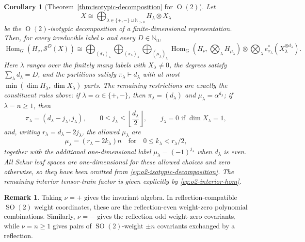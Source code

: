 \documentclass[11pt]{article}
\newcommand{\dsN}{\mathbb{N}}
\newcommand{\scS}{\mathcal{S}}
\newcommand{\HomG}[2]{\operatorname{Hom}_G\!\left(#1,#2\right)}
\newcommand{\SO}{\operatorname{SO}}
\newtheorem{corollary}[theorem]{Corollary}
\theoremstyle{definition}
\newtheorem{remark}[theorem]{Remark}
\begin{document}
\begin{corollary}[Theorem~\ref{thm:isotypic-decomposition} for $\operatorname{O}(2)$]\label{cor:o2-isotypic-decomposition}
  Let
  \[
    X\cong \bigoplus_{\lambda\in\{+,-\}\sqcup\dsN_{>0}}H_\lambda\otimes X_\lambda
  \]
  be the $\operatorname{O}(2)$-isotypic decomposition of a finite-dimensional representation.  Then, for every irreducible label $\nu$ and every $D\in\dsN_0$,
  \begin{equation}\label{eq:o2-isotypic-decomposition}
    \HomG{H_\nu}{\scS^D(X)}
    \cong
    \bigoplus_{(d_\lambda)_\lambda}
    \bigoplus_{(\pi_\lambda)_\lambda}
    \bigoplus_{(\mu_\lambda)_\lambda}
    \HomG{H_\nu}{\bigotimes_\lambda H_{\mu_\lambda}}
    \otimes
    \bigotimes_\lambda e_{\pi_\lambda}^*(X_\lambda^{\otimes d_\lambda}).
  \end{equation}
  Here $\lambda$ ranges over the finitely many labels with $X_\lambda\neq0$, the degrees satisfy $\sum_\lambda d_\lambda=D$, and the partitions satisfy $\pi_\lambda\vdash d_\lambda$ with at most $\min(\dim H_\lambda, \dim X_\lambda)$ parts.  The remaining restrictions are exactly the constituent rules above: if $\lambda=\alpha\in\{+,-\}$, then $\pi_\lambda=(d_\lambda)$ and $\mu_\lambda=\alpha^{d_\lambda}$; if $\lambda=n\ge 1$, then
  \[
    \pi_\lambda=(d_\lambda-j_\lambda,j_\lambda),
    \qquad
    0\le j_\lambda\le \left\lfloor\frac{d_\lambda}{2}\right\rfloor,
    \qquad
    j_\lambda=0\text{ if }\dim X_\lambda=1,
  \]
  and, writing $r_\lambda=d_\lambda-2j_\lambda$, the allowed $\mu_\lambda$ are
  \[
    \mu_\lambda=(r_\lambda-2k_\lambda)n
    \quad\text{for}\quad
    0\le k_\lambda<r_\lambda/2,
  \]
  together with the additional one-dimensional label $\mu_\lambda=(-1)^{j_\lambda}$ when $d_\lambda$ is even.  All Schur leaf spaces are one-dimensional for these allowed choices and zero otherwise, so they have been omitted from \eqref{eq:o2-isotypic-decomposition}.  The remaining interior tensor-train factor is given explicitly by \eqref{eq:o2-interior-hom}.
\end{corollary}

\begin{remark}
  Taking $\nu=+$ gives the invariant algebra.  In reflection-compatible $\SO(2)$ weight coordinates, these are the reflection-even weight-zero polynomial combinations.  Similarly, $\nu=-$ gives the reflection-odd weight-zero covariants, while $\nu=n\ge 1$ gives pairs of $\SO(2)$-weight $\pm n$ covariants exchanged by a reflection.
\end{remark}
\end{document}
